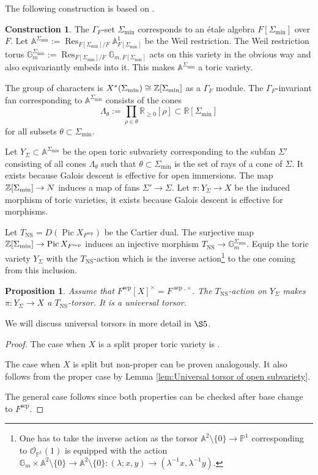 \documentclass[a4paper,11pt,reqno]{amsart}
\newcommand{\R}{\mathbb{R}}
\newcommand{\G}{\mathbb{G}}
\newcommand{\A}{\mathbb{A}}
\newcommand{\Proj}{\mathbb{P}}
\DeclareMathOperator{\Pic}{Pic}
\DeclareMathOperator{\NS}{NS}
\DeclareMathOperator{\Res}{Res}
\DeclareMathOperator{\sep}{sep}
\newtheorem{proposition}[theorem]{Proposition}
\theoremstyle{definition}
\newtheorem{construction}[theorem]{Construction}
\begin{document}
The following construction is based on \cite[Prop.~8.4]{Salberger1998Tamagawa}.
\begin{construction}\label{con:Construction of universal torsor}
	The $\Gamma_F$-set $\Sigma_{\min}$ corresponds to an \'etale algebra $F[\Sigma_{\min}]$ over $F$. Let $\A^{\Sigma_{\min}} := \Res_{F[\Sigma_{\min}]/F} \A^1_{F[\Sigma_{\min}]}$ be the Weil restriction. The Weil restriction torus $\G_m^{\Sigma_{\min}} := \Res_{F[\Sigma_{\min}]/F} \G_{m, F[\Sigma_{\min}]}$ acts on this variety in the obvious way and also equivariantly embeds into it. This makes $\A^{\Sigma_{\min}}$ a toric variety.
	
	The group of characters is $X^*(\Sigma_{\min}) \cong \mathbb{Z}[\Sigma_{\min}]$ as a $\Gamma_F$ module. The $\Gamma_F$-invariant fan corresponding to $\A^{\Sigma_{\min}}$ consists of the cones
	\begin{equation*}
		\Lambda_{\theta} := \prod_{\rho \in \theta} \R_{\geq 0}[\rho] \subset \R[\Sigma_{\min}]
	\end{equation*}
	for all subsets $\theta \subset \Sigma_{\min}$.
	
	Let $Y_{\Sigma} \subset \A^{\Sigma_{\min}}$ be the open toric subvariety corresponding to the subfan $\Sigma'$ consisting of all cones $\Lambda_{\theta}$ such that $\theta \subset \Sigma_{\min}$ is the set of rays of a cone of $\Sigma$. It exists because Galois descent is effective for open immersions. The map $\mathbb{Z}[\Sigma_{\min}] \to N$ induces a map of fans $\Sigma' \to \Sigma$. Let $\pi: Y_{\Sigma} \to X$ be the induced morphism of toric varieties, it exists because Galois descent is effective for morphisms.
	
	Let $T_{\NS} = D(\Pic X_{F^{\sep}})$ be the Cartier dual. The surjective map $\Z[\Sigma_{\min}] \to \Pic X_{F^{\sep}}$ induces an injective morphism $T_{\NS} \to \G_m^{\Sigma_{\min}}$. Equip the toric variety $Y_{\Sigma}$ with the $T_{\NS}$-action which is the inverse action\footnote{One has to take the inverse action as the torsor $\A^2 \setminus \{0\} \to \Proj^1$ corresponding to $\mathcal{O}_{\Proj^1}(1)$ is equipped with the action $\G_m \times \A^2 \setminus \{0\} \to \A^2 \setminus \{0\} : (\lambda ; x,y) \to (\lambda^{-1} x, \lambda^{-1} y)$.} to the one coming from this inclusion.
\end{construction}
\begin{proposition}\label{prop:Universal torsor of toric variety}
	Assume that $F^{\sep}[X]^{\times} = F^{\sep, \times}$. The $T_{\NS}$-action on $Y_{\Sigma}$ makes $\pi: Y_{\Sigma} \to X$ a $T_{\NS}$-torsor. It is a universal torsor.
\end{proposition}
We will discuss universal torsors in more detail in $\S 5$.
\begin{proof}
	The case when $X$ is a split proper toric variety is \cite[Prop. 8.5]{Salberger1998Tamagawa}. 
	
	The case when $X$ is split but non-proper can be proven analogously. It also follows from the proper case by Lemma \ref{lem:Universal torsor of open subvariety}.
	
	The general case follows since both properties can be checked after base change to $F^{\sep}$.
\end{proof}
\end{document}
